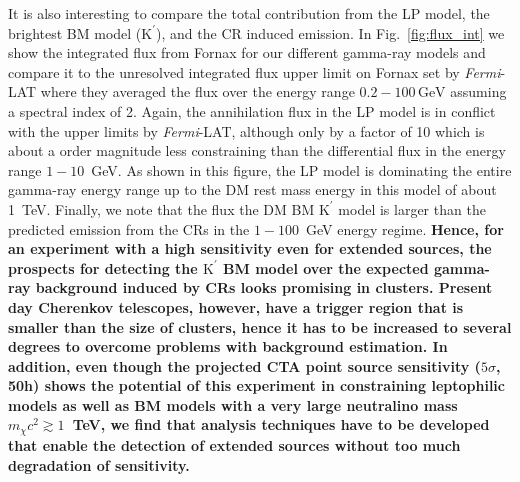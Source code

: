 \documentclass[10pt,aps,pra,reprint,amsmath,amsfonts,amssymb,showpacs,nofootinbib,floatfix]{revtex4-1}
\def\C#1{{\bf #1}}
\newcommand{\Fermi}{{\em Fermi}\xspace}
\newcommand{\rmn}{\mathrm}
\newcommand{\Kp}{\rmn{K}^\prime}
\newcommand{\gev}{\rmn{GeV}}
\begin{document}
It is also interesting to compare the total contribution from the LP
model, the brightest BM model ($\Kp$), and the CR induced emission. In
Fig.~\ref{fig:flux_int} we show the integrated flux from Fornax for
our different gamma-ray models and compare it to the unresolved
integrated flux upper limit on Fornax set by \Fermi-LAT where they
averaged the flux over the energy range $0.2-100\,\gev$ assuming a
spectral index of 2. Again, the annihilation flux in the LP model is
in conflict with the upper limits by \Fermi-LAT, although only by a
factor of 10 which is about a order magnitude less constraining than
the differential flux in the energy range $1-10$~GeV. As shown in this
figure, the LP model is dominating the entire gamma-ray energy range
up to the DM rest mass energy in this model of about 1~TeV. Finally,
we note that the flux the DM BM $\Kp$ model is larger than the
predicted emission from the CRs in the $1-100$~GeV energy
regime. \C{Hence, for an experiment with a high sensitivity even
  for extended sources, the prospects for detecting the $\Kp$ BM model
  over the expected gamma-ray background induced by CRs looks
  promising in clusters. Present day Cherenkov telescopes, however,
  have a trigger region that is smaller than the size of clusters,
  hence it has to be increased to several degrees to overcome problems
  with background estimation. In addition, even though the projected
  CTA point source sensitivity ($5\sigma$, 50h) shows the potential of
  this experiment in constraining leptophilic models as well as BM
  models with a very large neutralino mass $m_\chi c^2 \gtrsim 1$~TeV,
  we find that analysis techniques have to be developed that enable
  the detection of extended sources without too much degradation of
  sensitivity.}
\end{document}
